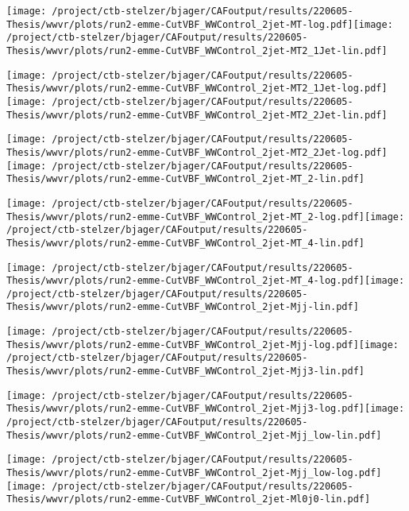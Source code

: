 \documentclass{article}
\begin{document}
\texttt{[image: /project/ctb-stelzer/bjager/CAFoutput/results/220605-Thesis/wwvr/plots/run2-emme-CutVBF\_WWControl\_2jet-MT-log.pdf]}\texttt{[image: /project/ctb-stelzer/bjager/CAFoutput/results/220605-Thesis/wwvr/plots/run2-emme-CutVBF\_WWControl\_2jet-MT2\_1Jet-lin.pdf]}

\texttt{[image: /project/ctb-stelzer/bjager/CAFoutput/results/220605-Thesis/wwvr/plots/run2-emme-CutVBF\_WWControl\_2jet-MT2\_1Jet-log.pdf]}\texttt{[image: /project/ctb-stelzer/bjager/CAFoutput/results/220605-Thesis/wwvr/plots/run2-emme-CutVBF\_WWControl\_2jet-MT2\_2Jet-lin.pdf]}

\texttt{[image: /project/ctb-stelzer/bjager/CAFoutput/results/220605-Thesis/wwvr/plots/run2-emme-CutVBF\_WWControl\_2jet-MT2\_2Jet-log.pdf]}\texttt{[image: /project/ctb-stelzer/bjager/CAFoutput/results/220605-Thesis/wwvr/plots/run2-emme-CutVBF\_WWControl\_2jet-MT\_2-lin.pdf]}

\texttt{[image: /project/ctb-stelzer/bjager/CAFoutput/results/220605-Thesis/wwvr/plots/run2-emme-CutVBF\_WWControl\_2jet-MT\_2-log.pdf]}\texttt{[image: /project/ctb-stelzer/bjager/CAFoutput/results/220605-Thesis/wwvr/plots/run2-emme-CutVBF\_WWControl\_2jet-MT\_4-lin.pdf]}

\texttt{[image: /project/ctb-stelzer/bjager/CAFoutput/results/220605-Thesis/wwvr/plots/run2-emme-CutVBF\_WWControl\_2jet-MT\_4-log.pdf]}\texttt{[image: /project/ctb-stelzer/bjager/CAFoutput/results/220605-Thesis/wwvr/plots/run2-emme-CutVBF\_WWControl\_2jet-Mjj-lin.pdf]}

\texttt{[image: /project/ctb-stelzer/bjager/CAFoutput/results/220605-Thesis/wwvr/plots/run2-emme-CutVBF\_WWControl\_2jet-Mjj-log.pdf]}\texttt{[image: /project/ctb-stelzer/bjager/CAFoutput/results/220605-Thesis/wwvr/plots/run2-emme-CutVBF\_WWControl\_2jet-Mjj3-lin.pdf]}

\texttt{[image: /project/ctb-stelzer/bjager/CAFoutput/results/220605-Thesis/wwvr/plots/run2-emme-CutVBF\_WWControl\_2jet-Mjj3-log.pdf]}\texttt{[image: /project/ctb-stelzer/bjager/CAFoutput/results/220605-Thesis/wwvr/plots/run2-emme-CutVBF\_WWControl\_2jet-Mjj\_low-lin.pdf]}

\texttt{[image: /project/ctb-stelzer/bjager/CAFoutput/results/220605-Thesis/wwvr/plots/run2-emme-CutVBF\_WWControl\_2jet-Mjj\_low-log.pdf]}\texttt{[image: /project/ctb-stelzer/bjager/CAFoutput/results/220605-Thesis/wwvr/plots/run2-emme-CutVBF\_WWControl\_2jet-Ml0j0-lin.pdf]}
\end{document}
